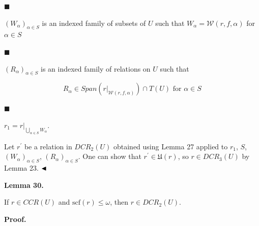  
 
\par\noindent  $\blacksquare$ 
 
$(W_{\alpha})_{\alpha\in S}$ is an indexed family of subsets of $U$ such that $W_{\alpha}=\mathcal{W}(r,f,\alpha)$ for $\alpha\in S$\par
 
 
 
\par\noindent  $\blacksquare$ 
 
$(R_{\alpha})_{\alpha\in S}$ is an indexed family of relations on $U$ such that\par
    \[R_{\alpha}\in{Span}(r|_{\mathcal{W}(r,f,\alpha)})\cap T(U)\text{ for }\alpha\in
S\]    
 
 
\par\noindent  $\blacksquare$ 
 
$r_{1}=r|_{\bigcup_{\alpha\in S}W_{\alpha}}$.\par
 
 
  
 
 
Let $r^{\prime}$ be a relation in $DCR_{2}(U)$ obtained using Lemma 27 applied to $r_{1}$, $S$, $(W_{\alpha})_{\alpha\in S}$, $(R_{\alpha})_{\alpha\in S}$. One can show that $r^{\prime}\in\mathfrak{U}(r)$, so $r\in DCR_{3}(U)$ by Lemma 23. $\hfill\blacktriangleleft$\par
 
 
 
\par\medskip\noindent\textbf{Lemma 30.}\par
 
 
If $r\in CCR(U)$ and $\mathrm{scf}(r)\leq\omega$, then $r\in DCR_{2}(U)$.\par
 
 
 
 
 
\par\medskip\noindent\textbf{Proof.}\par
 
